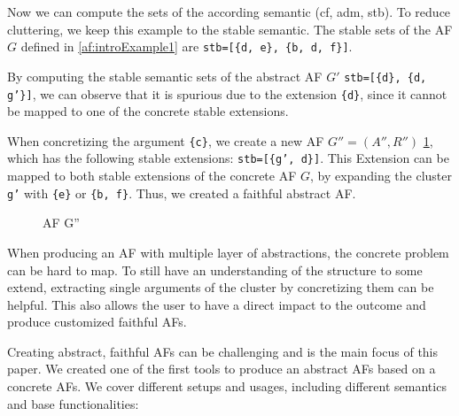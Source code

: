 Now we can compute the sets of the according semantic (\ac{cf}, \ac{adm}, \ac{stb}). To reduce cluttering, we keep this example to the stable semantic. The stable sets of the \ac{AF} $G$ defined in \ref{af:introExample1} are \texttt{stb=[\{d, e\}, \{b, d, f\}]}.

By computing the stable semantic sets of the abstract \ac{AF} $G'$ \texttt{stb=[\{d\}, \{d, g'\}]}, we can observe that it is spurious due to the extension \texttt{\{d\}}, since it cannot be mapped to one of the concrete stable extensions. 

When concretizing the argument \texttt{\{c\}}, we create a new \ac{AF} $G'' = (A'', R'')$ \ref{af:introExample3}, which has the following stable extensions: \texttt{stb=[\{g', d\}]}. This Extension can be mapped to both stable extensions of the concrete \ac{AF} $G$, by expanding the cluster \texttt{g'} with \texttt{\{e\}} or \texttt{\{b, f\}}. Thus, we created a faithful abstract \ac{AF}.

\begin{figure}[h]
    \centering
    \caption{\ac{AF} G''}
    \label{af:introExample3}
\end{figure}


When producing an \ac{AF} with multiple layer of abstractions, the concrete problem can be hard to map. To still have an understanding of the structure to some extend, extracting single arguments of the cluster by concretizing them can be helpful. This also allows the user to have a direct impact to the outcome and produce customized faithful \acp{AF}.  


Creating abstract, faithful \acp{AF} can be challenging and is the main focus of this paper. We created one of the first tools \cite{Pasero2024-AFClustering-Repo} to produce an abstract \acp{AF} based on a concrete \acp{AF}. We cover different setups and usages, including different semantics and base functionalities:

